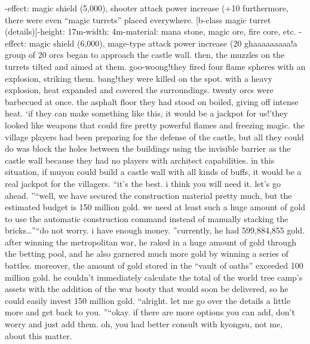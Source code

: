 -effect: magic shield (5,000), shooter attack power increase (+10%
furthermore, there were even “magic turrets” placed everywhere.
[b-class magic turret (details)]-height: 17m-width: 4m-material: mana stone, magic ore, fire core, etc.
-effect: magic shield (6,000), mage-type attack power increase (20%
ghaaaaaaaaa!a group of 20 orcs began to approach the castle wall.
 then, the muzzles on the turrets tilted and aimed at them.
goo-woong!they fired four flame spheres with an explosion, striking them.
bang!they were killed on the spot.
 with a heavy explosion, heat expanded and covered the surroundings.
 twenty orcs were barbecued at once.
 the asphalt floor they had stood on boiled, giving off intense heat.
‘if they can make something like this, it would be a jackpot for us!’they looked like weapons that could fire pretty powerful flames and freezing magic.
the village players had been preparing for the defense of the castle, but all they could do was block the holes between the buildings using the invisible barrier as the castle wall because they had no players with architect capabilities.
in this situation, if muyon could build a castle wall with all kinds of buffs, it would be a real jackpot for the villagers.
“it’s the best.
 i think you will need it.
 let’s go ahead.
”“well, we have secured the construction material pretty much, but the estimated budget is 150 million gold.
 we need at least such a huge amount of gold to use the automatic construction command instead of manually stacking the bricks…”“do not worry.
 i have enough money.
”currently, he had 599,884,855 gold.
 after winning the metropolitan war, he raked in a huge amount of gold through the betting pool, and he also garnered much more gold by winning a series of battles.
moreover, the amount of gold stored in the “vault of oaths” exceeded 100 million gold.
he couldn’t immediately calculate the total of the world tree camp’s assets with the addition of the war booty that would soon be delivered, so he could easily invest 150 million gold.
“alright.
 let me go over the details a little more and get back to you.
”“okay.
 if there are more options you can add, don’t worry and just add them.
 oh, you had better consult with kyongsu, not me, about this matter.
